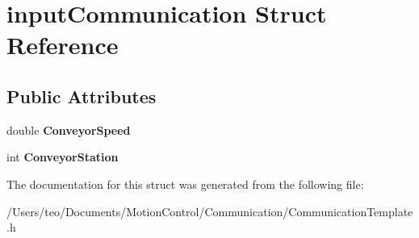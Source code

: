 \hypertarget{structinput_communication}{}\section{input\+Communication Struct Reference}
\label{structinput_communication}
\subsection*{Public Attributes}
\begin{DoxyCompactItemize}
\item 
\mbox{\label{structinput_communication_a507714177791ae81d503dadb79cb7b52}} 
double {\bfseries Conveyor\+Speed}
\item 
\mbox{\label{structinput_communication_abcd83363cbd9c1532d035f29eefd4d8c}} 
int {\bfseries Conveyor\+Station}
\end{DoxyCompactItemize}


The documentation for this struct was generated from the following file\+:\begin{DoxyCompactItemize}
\item 
/\+Users/teo/\+Documents/\+Motion\+Control/\+Communication/Communication\+Template.\+h\end{DoxyCompactItemize}
